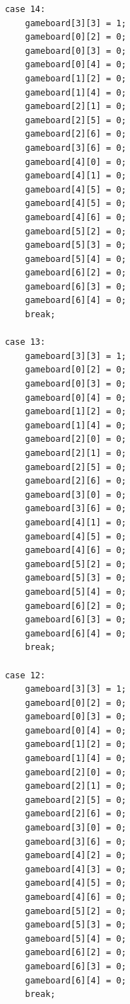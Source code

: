 \documentclass{article}
\begin{document}
\begin{lstlisting}
            case 14:
                gameboard[3][3] = 1;
                gameboard[0][2] = 0;
                gameboard[0][3] = 0;
                gameboard[0][4] = 0;
                gameboard[1][2] = 0;
                gameboard[1][4] = 0;
                gameboard[2][1] = 0;
                gameboard[2][5] = 0;
                gameboard[2][6] = 0;
                gameboard[3][6] = 0;
                gameboard[4][0] = 0;
                gameboard[4][1] = 0;
                gameboard[4][5] = 0;
                gameboard[4][5] = 0;
                gameboard[4][6] = 0;
                gameboard[5][2] = 0;
                gameboard[5][3] = 0;
                gameboard[5][4] = 0;
                gameboard[6][2] = 0;
                gameboard[6][3] = 0;
                gameboard[6][4] = 0;
                break;

            case 13:
                gameboard[3][3] = 1;
                gameboard[0][2] = 0;
                gameboard[0][3] = 0;
                gameboard[0][4] = 0;
                gameboard[1][2] = 0;
                gameboard[1][4] = 0;
                gameboard[2][0] = 0;
                gameboard[2][1] = 0;
                gameboard[2][5] = 0;
                gameboard[2][6] = 0;
                gameboard[3][0] = 0;
                gameboard[3][6] = 0;
                gameboard[4][1] = 0;
                gameboard[4][5] = 0;
                gameboard[4][6] = 0;
                gameboard[5][2] = 0;
                gameboard[5][3] = 0;
                gameboard[5][4] = 0;
                gameboard[6][2] = 0;
                gameboard[6][3] = 0;
                gameboard[6][4] = 0;
                break;

            case 12:
                gameboard[3][3] = 1;
                gameboard[0][2] = 0;
                gameboard[0][3] = 0;
                gameboard[0][4] = 0;
                gameboard[1][2] = 0;
                gameboard[1][4] = 0;
                gameboard[2][0] = 0;
                gameboard[2][1] = 0;
                gameboard[2][5] = 0;
                gameboard[2][6] = 0;
                gameboard[3][0] = 0;
                gameboard[3][6] = 0;
                gameboard[4][2] = 0;
                gameboard[4][3] = 0;
                gameboard[4][5] = 0;
                gameboard[4][6] = 0;
                gameboard[5][2] = 0;
                gameboard[5][3] = 0;
                gameboard[5][4] = 0;
                gameboard[6][2] = 0;
                gameboard[6][3] = 0;
                gameboard[6][4] = 0;
                break;


\end{lstlisting}
\end{document}
